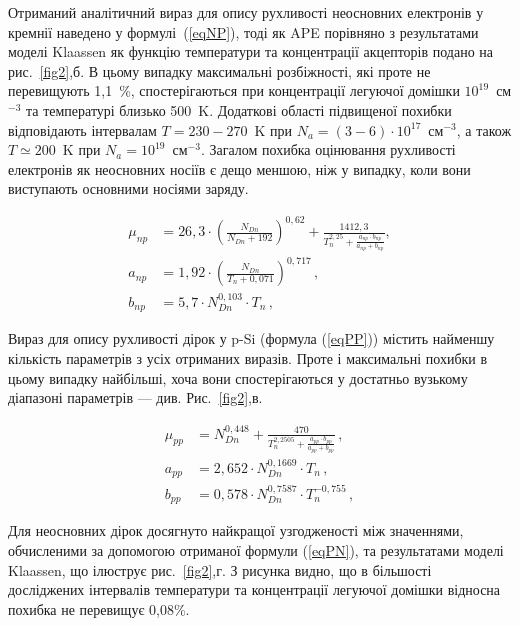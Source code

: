 \documentclass[fleqn,twoside,twocolumn,nofootinbib,showkeys]{revtex4} %
\begin{document}
Отриманий аналітичний вираз для опису рухливості неосновних електронів у кремнії наведено у формулі~(\ref{eqNP}),
тоді як APE порівняно з результатами моделі Klaassen як функцію температури та концентрації акцепторів подано на рис.~\ref{fig2},б.
В цьому випадку максимальні розбіжності, які проте не перевищують 1,1~\%, спостерігаються при
концентрації легуючої домішки $10^{19}$~см$^{-3}$ та температурі близько 500~K.
Додаткові області підвищеної похибки відповідають інтервалам
$T=230-270$~K при $N_a=(3-6)\cdot 10^{17}$~см$^{-3}$, а також $T\simeq200$~K при $N_a=10^{19}$~см$^{-3}$.
Загалом похибка оцінювання рухливості електронів як неосновних носіїв є дещо меншою, ніж у випадку, коли вони виступають основними носіями заряду.

\begin{subequations} \label{eqNP}
    \begin{align}
      \mu_{np}&\! =\!26,3\!\cdot\!\left(\frac{N_{Dn}}{N_{Dn}\!+\!192}\right)^{\!\!0,62}\!+\!\frac{1412,3}{T_n^{2,25}+\frac{a_{np}\cdot b_{np}}{a_{np}\!+\!b_{np}}}, \label{eqNPa} \\
      a_{np} &=1,92\cdot\left(\frac{N_{Dn}}{T_n+0,071}\right)^{0,717}\,, \label{eqNPb} \\
      b_{np}& =5,7\cdot N_{Dn}^{0,103}\cdot T_n\,, \label{eqNPc}
    \end{align}
\end{subequations}

Вираз для опису рухливості дірок у p-Si (формула (\ref{eqPP})) містить найменшу кількість параметрів з усіх отриманих виразів.
Проте і максимальні похибки в цьому випадку найбільші, хоча вони спостерігаються у достатньо вузькому діапазоні
параметрів --- див. Рис.~\ref{fig2},в.


\begin{subequations} \label{eqPP}
    \begin{align}
      \mu_{pp}& =N_{Dn}^{0,448}+\frac{470}{T_n^{2,2505}+\frac{a_{pp}\cdot b_{pp}}{a_{pp}+b_{pp}}}\,, \label{eqPPa} \\
      a_{pp} &=2,652 \cdot N_{Dn}^{0,1669}\cdot T_n\,, \label{eqPPb} \\
      b_{pp}& =0,578 \cdot N_{Dn}^{0,7587}\cdot T_n^{-0,755}\,, \label{eqPPc}
    \end{align}
\end{subequations}

Для неосновних дірок досягнуто найкращої узгодженості між значеннями,
обчисленими за допомогою отриманої формули (\ref{eqPN}), та результатами моделі Klaassen,
що ілюструє рис.~\ref{fig2},г.
З рисунка видно, що в більшості досліджених інтервалів температури та концентрації легуючої домішки відносна похибка не перевищує 0,08\%.
\end{document}
